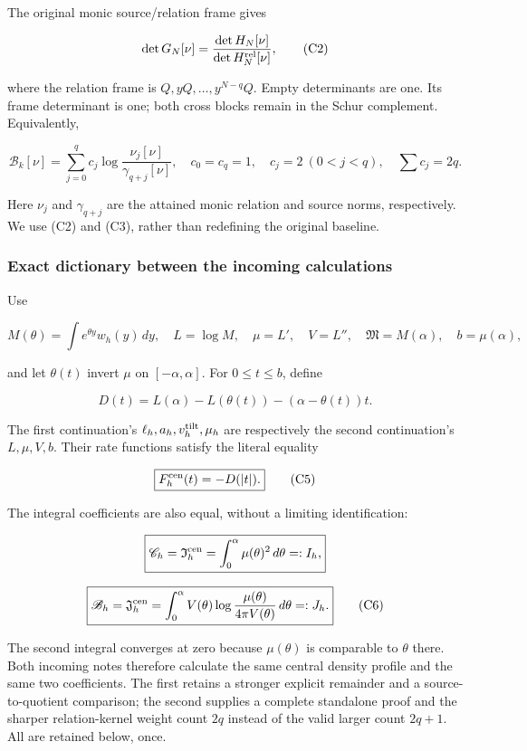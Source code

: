 The original monic source/relation frame gives

\[
\det G_N[\nu]=\frac{\det H_N[\nu]}{\det H_N^{\rm rel}[\nu]},
\tag{C2}
\]

where the relation frame is \(Q,yQ,\ldots,y^{N-q}Q\). Empty determinants are one. Its frame determinant is one; both cross blocks remain in the Schur complement. Equivalently,

\[
\mathcal B_k[\nu]=\sum_{j=0}^q c_j
\log\frac{\nu_j[\nu]}{\gamma_{q+j}[\nu]},\quad
c_0=c_q=1,\quad c_j=2\ (0<j<q),\quad \sum c_j=2q.
\tag{C3}
\]

Here \(\nu_j\) and \(\gamma_{q+j}\) are the attained monic relation and source norms, respectively. We use (C2) and (C3), rather than redefining the original baseline.

\subsubsection{Exact dictionary between the incoming calculations}\label{loc:exact-dictionary-between-the-incoming-calculations}

Use

\[
M(\theta)=\int e^{\theta y}w_h(y)\,dy,\quad L=\log M,
\quad \mu=L',\quad V=L'',\quad
\mathfrak M=M(\alpha),\quad b=\mu(\alpha),
\]

and let \(\theta(t)\) invert \(\mu\) on \([-\alpha,\alpha]\). For \(0\le t\le b\), define

\[
D(t)=L(\alpha)-L(\theta(t))-(\alpha-\theta(t))t.
\tag{C4}
\]

The first continuation's \(\ell_h,a_h,v_h^{\rm tilt},\mu_h\) are respectively the second continuation's \(L,\mu,V,b\). Their rate functions satisfy the literal equality

\[
\boxed{F_h^{\rm cen}(t)=-D(|t|).}
\tag{C5}
\]

The integral coefficients are also equal, without a limiting identification:

\[
\boxed{\mathscr C_h=\mathfrak I_h^{\rm cen}
=\int_0^\alpha\mu(\theta)^2\,d\theta=:I_h,}
\]

\[
\boxed{\mathscr B_h=\mathfrak J_h^{\rm cen}
=\int_0^\alpha V(\theta)
\log\frac{\mu(\theta)}{4\pi V(\theta)}\,d\theta=:J_h.}
\tag{C6}
\]

The second integral converges at zero because \(\mu(\theta)\) is comparable to \(\theta\) there. Both incoming notes therefore calculate the same central density profile and the same two coefficients. The first retains a stronger explicit remainder and a source-to-quotient comparison; the second supplies a complete standalone proof and the sharper relation-kernel weight count \(2q\) instead of the valid larger count \(2q+1\). All are retained below, once.

